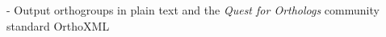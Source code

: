 \documentclass[twocolumn]{bmcart}%
\begin{document}
- Output orthogroups in plain text and the \textit{Quest for Orthologs} community standard OrthoXML \cite{Dessimoz:2012dj}



\end{document}
